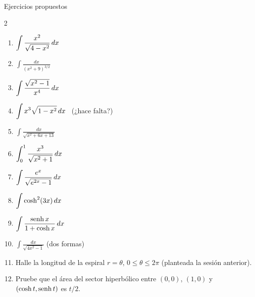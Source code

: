 \documentclass[10pt,aspectratio=169]{beamer}
\begin{document}
\begin{frame}{Ejercicios propuestos}
  \begin{ejercicio}
    \begin{multicols}{2}
    \begin{enumerate}
      \item $\displaystyle\int\frac{x^2}{\sqrt{4-x^2}}\,dx$
      \item $\displaystyle\int\frac{dx}{(x^2+9)^{3/2}}$
      \item $\displaystyle\int\frac{\sqrt{x^2-1}}{x^4}\,dx$
      \item $\displaystyle\int x^3\sqrt{1-x^2}\,dx$ \ \small(¿hace falta?)
      \item $\displaystyle\int\frac{dx}{\sqrt{x^2+6x+13}}$
      \item $\displaystyle\int_0^{1}\frac{x^3}{\sqrt{x^2+1}}\,dx$
      \item $\displaystyle\int\frac{e^x}{\sqrt{e^{2x}-1}}\,dx$
      \item $\displaystyle\int\cosh^2(3x)\,dx$
      \item $\displaystyle\int\frac{\operatorname{senh} x}{1+\cosh x}\,dx$
      \item $\displaystyle\int\frac{dx}{\sqrt{4x^2-1}}$ (dos formas)
    \end{enumerate}
    \end{multicols}
  \end{ejercicio}
  \begin{ejercicio}[: aplicaciones]
    \begin{enumerate}
      \setcounter{enumi}{10}
      \item Halle la longitud de la espiral $r=\theta$, $0\le\theta\le2\pi$ (planteada la sesión anterior).
      \item Pruebe que el área del sector hiperbólico entre $(0,0)$, $(1,0)$ y $(\cosh t,\operatorname{senh} t)$ es $t/2$.
    \end{enumerate}
  \end{ejercicio}
\end{frame}
\end{document}
